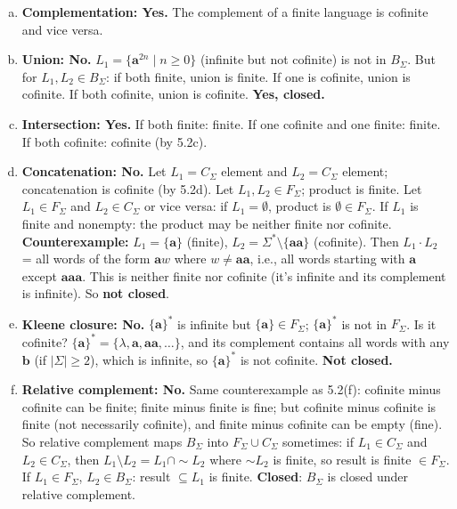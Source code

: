 \begin{enumerate}[{5.}1. ]
\begin{enumerate}[(a)]
  \item \textbf{Complementation: Yes.}  The complement of a finite language is cofinite and vice versa.
  \item \textbf{Union: No.}  $L_1=\{\pmb{a}^{2n}\mid n\ge 0\}$ (infinite but not cofinite) is not in $B_\Sigma$.  But for $L_1,L_2\in B_\Sigma$: if both finite, union is finite.  If one is cofinite, union is cofinite.  If both cofinite, union is cofinite.  \textbf{Yes, closed.}
  \item \textbf{Intersection: Yes.}  If both finite: finite.  If one cofinite and one finite: finite.  If both cofinite: cofinite (by 5.2c).
  \item \textbf{Concatenation: No.}  Let $L_1=C_\Sigma$ element and $L_2=C_\Sigma$ element; concatenation is cofinite (by 5.2d).  Let $L_1,L_2\in F_\Sigma$; product is finite.  Let $L_1\in F_\Sigma$ and $L_2\in C_\Sigma$ or vice versa: if $L_1=\emptyset$, product is $\emptyset\in F_\Sigma$.  If $L_1$ is finite and nonempty: the product may be neither finite nor cofinite.  \textbf{Counterexample:} $L_1=\{\pmb{a}\}$ (finite), $L_2=\Sigma^*\setminus\{\pmb{aa}\}$ (cofinite).  Then $L_1\cdot L_2$ = all words of the form $\pmb{a}w$ where $w\neq\pmb{aa}$, i.e., all words starting with $\pmb{a}$ except $\pmb{aaa}$.  This is neither finite nor cofinite (it's infinite and its complement is infinite).  So \textbf{not closed}.
  \item \textbf{Kleene closure: No.}  $\{\pmb{a}\}^*$ is infinite but $\{\pmb{a}\}\in F_\Sigma$; $\{\pmb{a}\}^*$ is not in $F_\Sigma$.  Is it cofinite?  $\{\pmb{a}\}^*=\{\lambda,\pmb{a},\pmb{aa},\ldots\}$, and its complement contains all words with any $\pmb{b}$ (if $|\Sigma|\ge 2$), which is infinite, so $\{\pmb{a}\}^*$ is not cofinite.  \textbf{Not closed.}
  \item \textbf{Relative complement: No.}  Same counterexample as 5.2(f): cofinite minus cofinite can be finite; finite minus finite is fine; but cofinite minus cofinite is finite (not necessarily cofinite), and finite minus cofinite can be empty (fine).  So relative complement maps $B_\Sigma$ into $F_\Sigma\cup C_\Sigma$ sometimes: if $L_1\in C_\Sigma$ and $L_2\in C_\Sigma$, then $L_1\setminus L_2=L_1\cap\sim L_2$ where $\sim L_2$ is finite, so result is finite $\in F_\Sigma$. If $L_1\in F_\Sigma$, $L_2\in B_\Sigma$: result $\subseteq L_1$ is finite.  \textbf{Closed}: $B_\Sigma$ is closed under relative complement.
\end{enumerate}


\end{enumerate}
